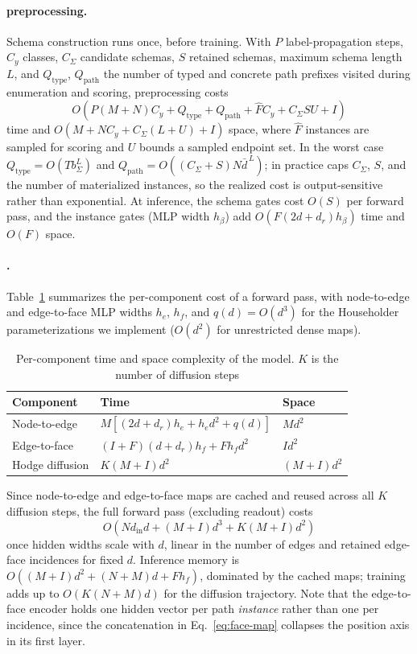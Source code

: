 \paragraph{\ampss{} preprocessing.} Schema construction runs once, before training. With $P$
label-propagation steps, $C_y$ classes, $C_\Sigma$ candidate schemas, $S$ retained schemas,
maximum schema length $L$, and $Q_{\mathrm{type}}$, $Q_{\mathrm{path}}$ the number of typed
and concrete path prefixes visited during enumeration and scoring, preprocessing costs
\[
O\!\left(P(M+N)C_y + Q_{\mathrm{type}} + Q_{\mathrm{path}} + \widehat{F}C_y + C_\Sigma S U + I\right)
\]
time and $O\!\left(M+NC_y+C_\Sigma(L+U)+I\right)$ space, where $\widehat{F}$ instances are
sampled for scoring and $U$ bounds a sampled endpoint set. In the worst case
$Q_{\mathrm{type}}=O(Tb_\Sigma^{L})$ and $Q_{\mathrm{path}}=O((C_\Sigma+S)N\bar{d}^{\,L})$;
in practice \ampss{} caps $C_\Sigma$, $S$, and the number of materialized instances, so the
realized cost is output-sensitive rather than exponential. At inference, the schema gates
cost $O(S)$ per forward pass, and the instance gates (MLP width $h_\beta$) add
$O\!\left(F(2d+d_r)h_\beta\right)$ time and $O(F)$ space.

\paragraph{\method{}.} Table~\ref{tab:complexity} summarizes the per-component
cost of a forward pass, with node-to-edge and edge-to-face MLP widths $h_e$, $h_f$, and
$q(d)=O(d^3)$ for the Householder parameterizations we implement ($O(d^2)$ for
unrestricted dense maps).

\begin{table}[h]
\centering
\scriptsize
\caption{Per-component time and space complexity of the \method{} model. $K$ is the number of diffusion steps}
\label{tab:complexity}
\begin{tabular}{lll}
\toprule
Component & Time & Space \\
\midrule
Node-to-edge & $M\left[(2d+d_r)h_e+h_ed^2+q(d)\right]$ & $Md^2$ \\
Edge-to-face & $(I+F)(d+d_r)h_f+Fh_fd^2$ & $Id^2$ \\
Hodge diffusion & $K(M+I)d^2$ & $(M+I)d^2$ \\
\bottomrule
\end{tabular}
\end{table}

Since node-to-edge and edge-to-face maps are cached and reused across all $K$ diffusion
steps, the full forward pass (excluding readout) costs
\[
O\!\left(Nd_{\mathrm{in}}d + (M+I)d^3 + K(M+I)d^2\right)
\]
once hidden widths scale with $d$, linear in the number of edges and retained edge-face
incidences for fixed $d$. Inference memory is $O\!\left((M+I)d^2+(N+M)d+Fh_f\right)$,
dominated by the cached maps; training adds up to $O(K(N+M)d)$ for the diffusion trajectory.
Note that the edge-to-face encoder holds one hidden vector per path \emph{instance} rather than
one per incidence, since the concatenation in Eq.~\eqref{eq:face-map} collapses the position axis
in its first layer.

